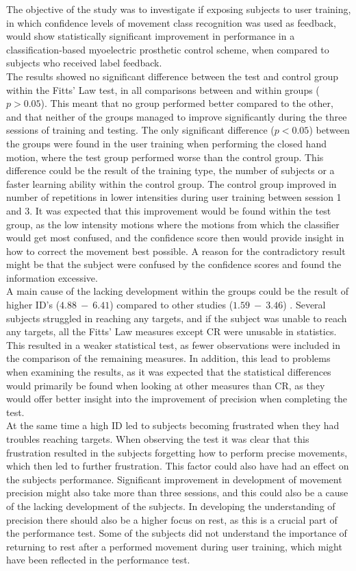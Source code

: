 The objective of the study was to investigate if exposing subjects to user training, in which confidence levels of movement class recognition was used as feedback, would show statistically significant improvement in performance in a classification-based myoelectric prosthetic control scheme, when compared to subjects who received label feedback. \\
The results showed no significant difference between the test and control group within the Fitts' Law test, in all comparisons between and within groups ($p > 0.05$). This meant that no group performed better compared to the other, and that neither of the groups managed to improve significantly during the three sessions of training and testing. The only significant difference ($p < 0.05$) between the groups were found in the user training when performing the closed hand motion, where the test group performed worse than the control group. This difference could be the result of the training type, the number of subjects or a faster learning ability within the control group. The control group improved in number of repetitions in lower intensities during user training between session 1 and 3. It was expected that this improvement would be found within the test group, as the low intensity motions where the motions from which the classifier would get most confused, and the confidence score then would provide insight in how to correct the movement best possible. A reason for the contradictory result might be that the subject were confused by the confidence scores and found the information excessive. \\
A main cause of the lacking development within the groups could be the result of higher ID's ($4.88~-~6.41$) compared to other studies ($1.59~-~3.46$) \cite{Scheme2013, Scheme2013a}. Several subjects struggled in reaching any targets, and if the subject was unable to reach any targets, all the Fitts' Law measures except CR were unusable in statistics. This resulted in a weaker statistical test, as fewer observations were included in the comparison of the remaining measures. In addition, this lead to problems when examining the results, as it was expected that the statistical differences would primarily be found when looking at other measures than CR, as they would offer better insight into the improvement of precision when completing the test.  \\
At the same time a high ID led to subjects becoming frustrated when they had troubles reaching targets. When observing the test it was clear that this frustration resulted in the subjects forgetting how to perform precise movements, which then led to further frustration. This factor could also have had an effect on the subjects performance. Significant improvement in development of movement precision might also take more than three sessions, and this could also be a cause of the lacking development of the subjects. In developing the understanding of precision there should also be a higher focus on rest, as this is a crucial part of the performance test. Some of the subjects did not understand the importance of returning to rest after a performed movement during user training, which might have been reflected in the performance test.\\
